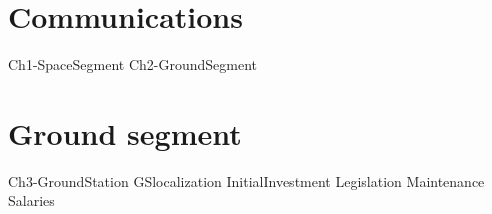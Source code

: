 % 
%





\setlength{\parindent}{0pt}

\usepackage{epigraph}




\newpage\thispagestyle{EmptyPage}
\mbox{}\newpage


\tableofcontents

\listoftables

\listoffigures



\newpage
{}

\newpage
\setlength{\parskip}{1em}
\part{Communications}
{Ch1-SpaceSegment}
{Ch2-GroundSegment}
\part{Ground segment}
{Ch3-GroundStation}
{GSlocalization}
{InitialInvestment}
{Legislation}
{Maintenance}
{Salaries}




 

